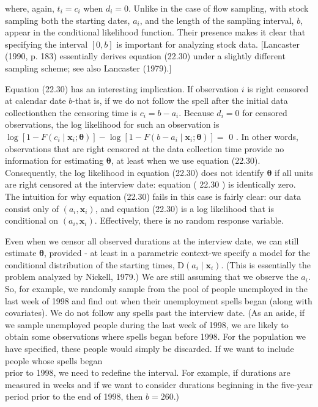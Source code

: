 \documentclass[10pt]{article}
\begin{document}
where, again, $t_{i}=c_{i}$ when $d_{i}=0$. Unlike in the case of flow sampling, with stock sampling both the starting dates, $a_{i}$, and the length of the sampling interval, $b$, appear in the conditional likelihood function. Their presence makes it clear that specifying the interval $[0, b]$ is important for analyzing stock data. [Lancaster (1990, p. 183) essentially derives equation (22.30) under a slightly different sampling scheme; see also Lancaster (1979).]

Equation (22.30) has an interesting implication. If observation $i$ is right censored at calendar date $b$-that is, if we do not follow the spell after the initial data collectionthen the censoring time is $c_{i}=b-a_{i}$. Because $d_{i}=0$ for censored observations, the log likelihood for such an observation is $\log \left[1-F\left(c_{i} \mid \mathbf{x}_{i} ; \boldsymbol{\theta}\right)\right]-\log \left[1-F\left(b-a_{i} \mid \mathbf{x}_{i} ; \boldsymbol{\theta}\right)\right]=$ 0 . In other words, observations that are right censored at the data collection time provide no information for estimating $\boldsymbol{\theta}$, at least when we use equation (22.30). Consequently, the log likelihood in equation (22.30) does not identify $\boldsymbol{\theta}$ if all units are right censored at the interview date: equation ( 22.30 ) is identically zero. The intuition for why equation (22.30) fails in this case is fairly clear: our data consist only of $\left(a_{i}, \mathbf{x}_{i}\right)$, and equation (22.30) is a log likelihood that is conditional on $\left(a_{i}, \mathbf{x}_{i}\right)$. Effectively, there is no random response variable.

Even when we censor all observed durations at the interview date, we can still estimate $\boldsymbol{\theta}$, provided - at least in a parametric context-we specify a model for the conditional distribution of the starting times, $\mathrm{D}\left(a_{i} \mid \mathbf{x}_{i}\right)$. (This is essentially the problem analyzed by Nickell, 1979.) We are still assuming that we observe the $a_{i}$. So, for example, we randomly sample from the pool of people unemployed in the last week of 1998 and find out when their unemployment spells began (along with covariates). We do not follow any spells past the interview date. (As an aside, if we sample unemployed people during the last week of 1998, we are likely to obtain some observations where spells began before 1998. For the population we have specified, these people would simply be discarded. If we want to include people whose spells began\\
prior to 1998, we need to redefine the interval. For example, if durations are measured in weeks and if we want to consider durations beginning in the five-year period prior to the end of 1998, then $b=260$.)
\end{document}

